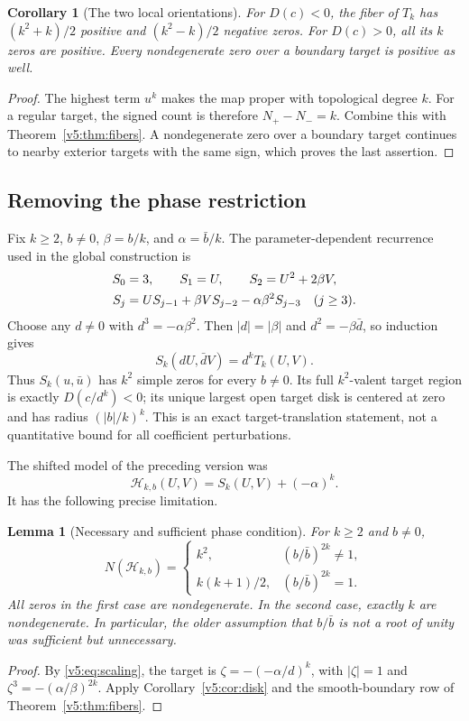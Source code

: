\documentclass[UTF8,11pt]{ctexart}
\newtheorem{lem}[thm]{Lemma}
\newtheorem{cor}[thm]{Corollary}
\theoremstyle{definition}
\numberwithin{equation}{section}
\begin{document}
\begin{cor}[The two local orientations]\label{v5:cor:orientation}
For $D(c)<0$, the fiber of $T_k$ has
$(k^2+k)/2$ positive and $(k^2-k)/2$ negative zeros.
For $D(c)>0$, all its $k$ zeros are positive. Every nondegenerate
zero over a boundary target is positive as well.
\end{cor}
\begin{proof}
The highest term $u^k$ makes the map proper with topological
degree $k$. For a regular target, the signed count is therefore
$N_+-N_-=k$. Combine this with Theorem~\ref{v5:thm:fibers}.
A nondegenerate zero over a boundary target continues to nearby
exterior targets with the same sign, which proves the last assertion.
\end{proof}

\subsection{Removing the phase restriction}

Fix $k\ge2$, $b\ne0$, $\beta=b/k$, and $\alpha=\bar b/k$.
The parameter-dependent recurrence used in the global construction is
\begin{align}
 S_0&=3,\qquad S_1=U,\qquad S_2=U^2+2\beta V,\notag\\
 S_j&=US_{j-1}+\beta VS_{j-2}-\alpha\beta^2S_{j-3}
                  \quad(j\ge3).\label{v3:eq:recurrence}
\end{align}
Choose any $d\ne0$ with $d^3=-\alpha\beta^2$. Then
$|d|=|\beta|$ and $d^2=-\beta\bar d$, so induction gives
\begin{equation}\label{v5:eq:scaling}
 S_k(dU,\bar d V)=d^kT_k(U,V).
\end{equation}
Thus $S_k(u,\bar u)$ has $k^2$ simple zeros for every $b\ne0$.
Its full $k^2$-valent target region is exactly
$D(c/d^k)<0$; its unique largest open target disk is centered
at zero and has radius $(|b|/k)^k$. This is an exact target-translation statement,
not a quantitative bound for all coefficient perturbations.

The shifted model of the preceding version was
\begin{equation}\label{v3:eq:model}
 \mathcal H_{k,b}(U,V)=S_k(U,V)+(-\alpha)^k.
\end{equation}
It has the following precise limitation.
\begin{lem}[Necessary and sufficient phase condition]\label{v3:lem:localmodel}
For $k\ge2$ and $b\ne0$,
\[
 N(\mathcal H_{k,b})=
 \begin{cases}
 k^2,&(b/\bar b)^{2k}\ne1,\\
 k(k+1)/2,&(b/\bar b)^{2k}=1.
 \end{cases}
\]
All zeros in the first case are nondegenerate. In the second case,
exactly $k$ are nondegenerate. In particular, the older assumption
that $b/\bar b$ is not a root of unity was sufficient but unnecessary.
\end{lem}
\begin{proof}
By \eqref{v5:eq:scaling}, the target is
$\zeta=-(-\alpha/d)^k$, with $|\zeta|=1$ and
$\zeta^3=-(\alpha/\beta)^{2k}$.
Apply Corollary~\ref{v5:cor:disk} and the smooth-boundary row of
Theorem~\ref{v5:thm:fibers}.
\end{proof}
\end{document}
